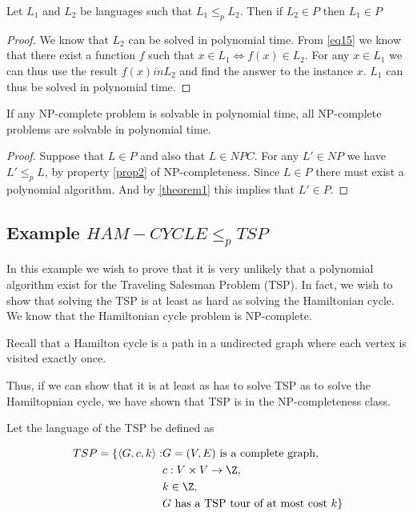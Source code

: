 \documentclass[10pt]{article}
\begin{document}
\begin{theorem}
Let $L_1$ and $L_2$ be languages such that $L_1 \leq_p L_2$. Then if $L_2 \in P$ then $L_1 \in P$  
\label{theorem1}
\end{theorem}

\begin{proof}
We know that $L_2$ can be solved in polynomial time. From \ref{eq15} we know that there exist a function $f$ such that $x \in L_1 \Leftrightarrow f(x) \in L_2$. For any $x \in L_1$ we can thus use the result $f(x) in L_2$ and find the answer to the instance $x$. $L_1$ can thus be solved in polynomial time.  
\end{proof}

\begin{theorem}
If any NP-complete problem is solvable in polynomial time, all NP-complete problems are solvable in polynomial time.
\end{theorem}

\begin{proof}
  Suppose that $L \in P$ and also that $L \in NPC$. For any $L' \in NP$ we have $L' \leq_p L$, by property \ref{prop2} of NP-completeness. Since $L \in P$ there must exist a polynomial algorithm. And by \ref{theorem1} this implies that $L' \in P$.
\end{proof}




\subsection{Example $HAM-CYCLE \leq_p TSP$} %
\label{sub:subsection_name}
In this example we wish to prove that it is very unlikely that a polynomial algorithm exist for the Traveling Salesman Problem (TSP). In fact, we wish to show that solving the TSP is at least as hard as solving the Hamiltonian cycle. We know that the Hamiltonian cycle problem is NP-complete. 

Recall that a Hamilton cycle is a path in a undirected graph where each vertex is visited exactly once.

Thus, if we can show that it is at least as has to solve TSP as to solve the Hamiltopnian cycle, we have shown that TSP is in the NP-completeness class. 

Let the language of the TSP be defined as

\begin{align*}
TSP = \{\langle G, c, k \rangle : & G = (V,E) \text{ is a complete graph}, \\ 
                                  & c:V \times V \rightarrow \Z, \\
                                  & k \in \Z, \\
                                  & \text{$G$ has a TSP tour of at most cost $k$}\}
\end{align*}
\end{document}
